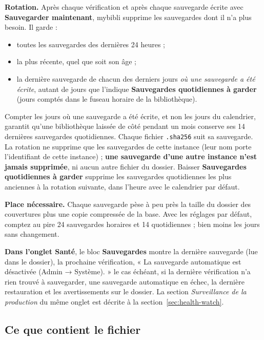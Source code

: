 \textbf{Rotation.} Après chaque vérification et après chaque sauvegarde
écrite avec \textbf{Sauvegarder maintenant}, mybibli supprime les
sauvegardes dont il n'a plus besoin. Il garde :
\begin{itemize}
  \item toutes les sauvegardes des dernières 24 heures ;
  \item la plus récente, quel que soit son âge ;
  \item la dernière sauvegarde de chacun des derniers jours \emph{où une
        sauvegarde a été écrite}, autant de jours que l'indique
        \textbf{Sauvegardes quotidiennes à garder} (jours comptés dans
        le fuseau horaire de la bibliothèque).
\end{itemize}
Compter les jours où une sauvegarde a été écrite, et non les jours du
calendrier, garantit qu'une bibliothèque laissée de côté pendant un mois
conserve ses 14 dernières sauvegardes quotidiennes. Chaque fichier
\texttt{.sha256} suit sa sauvegarde. La rotation ne supprime que les
sauvegardes de cette instance (leur nom porte l'identifiant de cette
instance) ; \textbf{une sauvegarde d'une autre instance n'est jamais
supprimée}, ni
aucun autre fichier du dossier. Baisser \textbf{Sauvegardes quotidiennes
à garder} supprime les sauvegardes quotidiennes les plus anciennes à la
rotation suivante, dans l'heure avec le calendrier par défaut.

\textbf{Place nécessaire.} Chaque sauvegarde pèse à peu près la taille du
dossier des couvertures plus une copie compressée de la base. Avec les
réglages par défaut, comptez au pire 24 sauvegardes horaires et 14
quotidiennes ; bien moins les jours sans changement.

\textbf{Dans l'onglet Santé}, le bloc \textbf{Sauvegardes} montre la
dernière sauvegarde (lue dans le dossier), la prochaine vérification,
« La sauvegarde automatique est désactivée (Admin → Système). » le cas
échéant, si la dernière vérification n'a rien trouvé à sauvegarder, une
sauvegarde automatique en échec, la dernière restauration et les
avertissements sur le dossier. La section \emph{Surveillance de la
production} du même onglet est décrite à la
section~\ref{sec:health-watch}.

\subsection*{Ce que contient le fichier}

